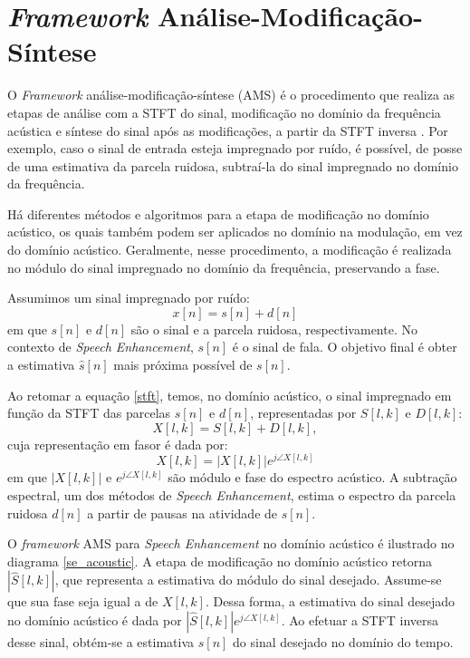 \section{\textit{Framework} Análise-Modificação-Síntese}
 
O \textit{Framework} análise-modificação-síntese (AMS) é o procedimento que
realiza as etapas de análise com a STFT do sinal, modificação no domínio da
frequência acústica e síntese do sinal após as modificações, a partir da STFT
inversa \cite{paliwal2015}. Por exemplo, caso o sinal de entrada esteja
impregnado por ruído, é possível, de posse de uma estimativa da parcela ruidosa,
subtraí-la do sinal impregnado no domínio da frequência.

Há diferentes métodos e algoritmos para a etapa de modificação no domínio
acústico, os quais também podem ser aplicados no domínio na modulação, em vez do
domínio acústico. Geralmente, nesse procedimento, a modificação é realizada no
módulo do sinal impregnado no domínio da frequência, preservando a fase.

Assumimos um sinal impregnado por ruído: 
\begin{equation}
    x[n] = s[n] + d[n]
\end{equation}
em que $s[n]$ e $d[n]$ são o sinal e a parcela ruidosa, respectivamente. No
contexto de \textit{Speech Enhancement}, $s[n]$ é o sinal de fala. O objetivo
final é obter a estimativa $\hat{s}[n]$ mais próxima possível de $s[n]$.

Ao retomar a equação \ref{stft}, temos, no domínio acústico, o sinal impregnado
em função da STFT das parcelas $s[n]$ e $d[n]$, representadas por $S[l, k]$ e
$D[l, k]$:
\begin{equation} \label{chap_3:stft_sum}
    X[l, k] = S[l, k] + D[l, k],
\end{equation}
cuja representação em fasor é dada por:
\begin{equation}
    X[l, k] = |X[l, k]| e^{j\angle{X[l, k]}}
\end{equation}
em que $|X[l, k]|$ e $e^{j\angle{X[l, k]}}$ são módulo e fase do espectro
acústico. A subtração espectral, um dos métodos de \textit{Speech Enhancement},
estima o espectro da parcela ruidosa $d[n]$ a partir de pausas na atividade de
$s[n]$.

O \textit{framework} AMS para \textit{Speech Enhancement} no domínio acústico é
ilustrado no diagrama \ref{se_acoustic}. A etapa de modificação no domínio
acústico retorna $|\hat{S}[l, k]|$, que representa a estimativa do módulo do
sinal desejado. Assume-se que sua fase seja igual a de $X[l, k]$. Dessa forma, a
estimativa do sinal desejado no domínio acústico é dada por $|\hat{S}[l,
k]|e^{j\angle{X[l, k]}}$. Ao efetuar a STFT inversa desse sinal, obtém-se a
estimativa $\hat{s}[n]$ do sinal desejado no domínio do tempo.

